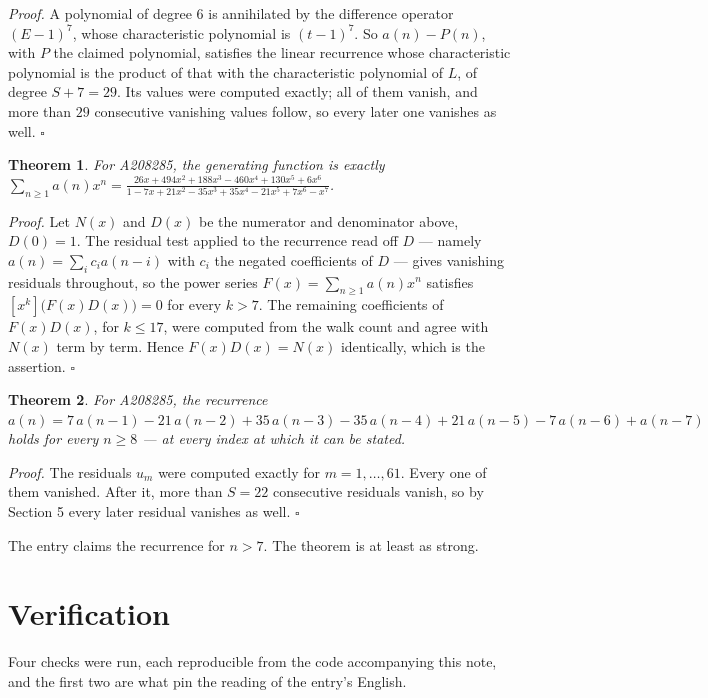 \documentclass[11pt]{article}
\newtheorem{theorem}{Theorem}
\theoremstyle{definition}
\begin{document}
{\itshape Proof.} A polynomial of degree $6$ is annihilated by the difference operator $(E-1)^{7}$, whose characteristic polynomial is $(t-1)^{7}$. So $a(n) - P(n)$, with $P$ the claimed polynomial, satisfies the linear recurrence whose characteristic polynomial is the product of that with the characteristic polynomial of $L$, of degree $S + 7 = 29$. Its values were computed exactly; all of them vanish, and more than $29$ consecutive vanishing values follow, so every later one vanishes as well. $\square$

\begin{theorem} For A208285, the generating function is exactly $\sum_{n\ge 1} a(n)x^n = \frac{26x + 494x^{2} + 188x^{3} - 460x^{4} + 130x^{5} + 6x^{6}}{1 - 7x + 21x^{2} - 35x^{3} + 35x^{4} - 21x^{5} + 7x^{6} - x^{7}}$.\end{theorem}

{\itshape Proof.} Let $N(x)$ and $D(x)$ be the numerator and denominator above, $D(0)=1$. The residual test applied to the recurrence read off $D$ --- namely $a(n) = \sum_i c_i a(n-i)$ with $c_i$ the negated coefficients of $D$ --- gives vanishing residuals throughout, so the power series $F(x)=\sum_{n\ge 1}a(n)x^n$ satisfies $[x^k]\bigl(F(x)D(x)\bigr) = 0$ for every $k > 7$. The remaining coefficients of $F(x)D(x)$, for $k \le 17$, were computed from the walk count and agree with $N(x)$ term by term. Hence $F(x)D(x) = N(x)$ identically, which is the assertion. $\square$

\begin{theorem} For A208285, the recurrence $a(n) = 7\,a(n-1) - 21\,a(n-2) + 35\,a(n-3) - 35\,a(n-4) + 21\,a(n-5) - 7\,a(n-6) + a(n-7)$ holds for every $n \ge 8$ --- at every index at which it can be stated.\end{theorem}

{\itshape Proof.} The residuals $u_m$ were computed exactly for $m = 1,\dots,61$. Every one of them vanished. After it, more than $S = 22$ consecutive residuals vanish, so by Section 5 every later residual vanishes as well. $\square$

The entry claims the recurrence for $n > 7$. The theorem is at least as strong.

\section{Verification}

Four checks were run, each reproducible from the code accompanying this note, and the first two are what pin the reading of the entry's English.
\end{document}
